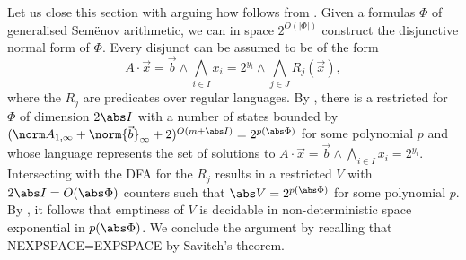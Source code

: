 Let us close this section with arguing how  follows
from . Given a formulas $\Phi$ of generalised
Sem{\"e}nov arithmetic, we can in space $2^{O(|\Phi|)}$ construct the
disjunctive normal form of $\Phi$. Every disjunct can be assumed
to be of the form
%
\[
A\cdot \vec x = \vec b \wedge \bigwedge_{i\in I} x_i = 2^{y_i} \wedge
\bigwedge_{j\in J} R_j(\vec x),
\]
%
where the $R_j$ are predicates over regular languages. By
, there is a restricted \laVASS for $\Phi$ of
dimension $2 \abs I$ with a number of states bounded by $(\norm
A_{1,\infty} + \norm{\vec b}_\infty + 2)^{O(m+\abs
I)}=2^{p(\abs \Phi)}$ for some polynomial $p$ and whose language
represents the set of solutions to $A\cdot
\vec x = \vec b \wedge \bigwedge_{i\in I} x_i = 2^{y_i}$. Intersecting
with the DFA for the $R_j$ results in a restricted \laVASS $V$ with
$2\abs I=O(\abs \Phi)$ counters such that $\abs V = 2^{p(\abs \Phi)}$
for some polynomial $p$. By , it follows that
emptiness of $V$ is decidable in non-deterministic space exponential in
$p(\abs \Phi)$. We conclude the argument by recalling that NEXPSPACE=EXPSPACE by Savitch's theorem.

